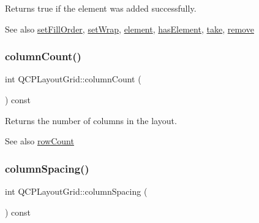 Returns true if the element was added successfully.

\begin{DoxySeeAlso}{See also}
\mbox{\hyperlink{class_q_c_p_layout_grid_affc2f3cfd22f28698c5b29b960d2a391}{set\+Fill\+Order}}, \mbox{\hyperlink{class_q_c_p_layout_grid_ab36af18d77e4428386d02970382ee598}{set\+Wrap}}, \mbox{\hyperlink{class_q_c_p_layout_grid_a602b426609b4411cf6a93c3ddf3a381a}{element}}, \mbox{\hyperlink{class_q_c_p_layout_grid_ab0cf4f7edc9414a3bfaddac0f46dc0a0}{has\+Element}}, \mbox{\hyperlink{class_q_c_p_layout_grid_aee961c2eb6cf8a85dcbc5a7d7b6c1a00}{take}}, \mbox{\hyperlink{class_q_c_p_layout_a6c58f537d8086f352576ab7c5b15d0bc}{remove}} 
\end{DoxySeeAlso}
\mbox{\label{class_q_c_p_layout_grid_a1a2962cbf45011405b64b913afa8e7a2}} 
\subsubsection{\texorpdfstring{columnCount()}{columnCount()}}
{\footnotesize\ttfamily int Q\+C\+P\+Layout\+Grid\+::column\+Count (\begin{DoxyParamCaption}{ }\end{DoxyParamCaption}) const\hspace{0.3cm}{\ttfamily [inline]}}

Returns the number of columns in the layout.

\begin{DoxySeeAlso}{See also}
\mbox{\hyperlink{class_q_c_p_layout_grid_a19c66fd76cbce58a8e94f33797e0c0aa}{row\+Count}} 
\end{DoxySeeAlso}
\mbox{\label{class_q_c_p_layout_grid_adcf4c387d5996bf6e4ae0ed26138247e}} 
\subsubsection{\texorpdfstring{columnSpacing()}{columnSpacing()}}
{\footnotesize\ttfamily int Q\+C\+P\+Layout\+Grid\+::column\+Spacing (\begin{DoxyParamCaption}{ }\end{DoxyParamCaption}) const\hspace{0.3cm}{\ttfamily [inline]}}

